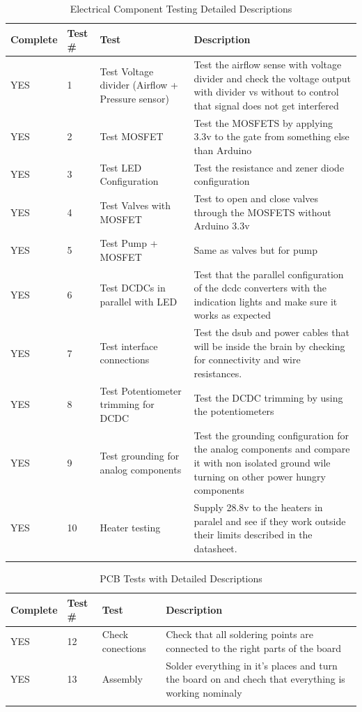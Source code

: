 \documentclass[a4paper,12pt,oneside]{article}
\begin{document}
\begin{appendices}
\begin{longtable}{|m{}|m{}|m{}|m{}|}
\hline
Complete & Test \# & Test & Description \\ \hline
YES & 1 & Test Voltage divider (Airflow + Pressure sensor) & Test the airflow sense with voltage divider and check the voltage output with divider vs without to control that signal does not get interfered \\ \hline
YES & 2 & Test MOSFET & Test the MOSFETS by applying 3.3v to the gate from something else than Arduino \\ \hline
YES & 3 & Test LED Configuration & Test the resistance and zener diode configuration\\ \hline
YES & 4 & Test Valves with MOSFET & Test to open and close valves through the MOSFETS without Arduino 3.3v  \\ \hline
YES & 5 & Test Pump + MOSFET & Same as valves but for pump  \\ \hline
YES & 6 & Test DCDCs in parallel with LED & Test that the parallel configuration of the dcdc converters with the indication lights and make sure it works as expected  \\ \hline
YES & 7 & Test interface connections & Test the dsub and power cables that will be inside the brain by checking for connectivity and wire resistances.  \\ \hline
YES & 8 & Test Potentiometer trimming for DCDC & Test the DCDC trimming by using the potentiometers \\ \hline
YES & 9 & Test grounding for analog components & Test the grounding configuration for the analog components and compare it with non isolated ground wile turning on other power hungry components \\ \hline
YES & 10 & Heater testing & Supply 28.8v to the heaters in paralel and see if they work outside their limits described in the datasheet. \\ \hline
\caption{Electrical Component Testing Detailed Descriptions}
\label{tab:test33-result-electrical-component}
\end{longtable}
\begin{longtable}{|m{}|m{}|m{}|m{}|}
\hline
Complete & Test \# & Test & Description \\ \hline
YES & 12 & Check conections & Check that all soldering points are connected to the right parts of the board \\ \hline
YES & 13 & Assembly & Solder everything in it's places and turn the board on and chech that everything is working nominaly
\\ \hline
\caption{PCB Tests with Detailed Descriptions}
\label{tab:test33-result-PCB-Tests}
\end{longtable}




\end{appendices}
\end{document}
